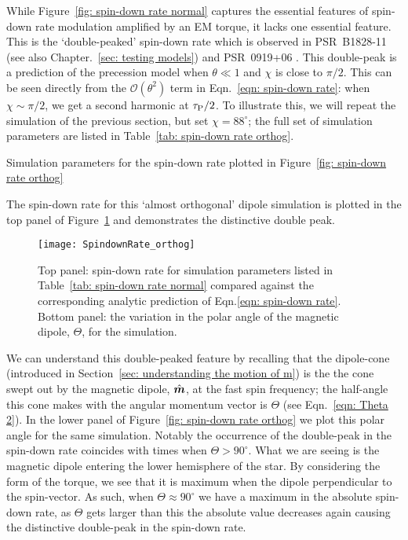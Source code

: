 \documentclass[../full_thesis/full_thesis.tex]{subfiles}
\newcommand{\thisdir}{../inertial_frame}
\begin{document}
While Figure~\ref{fig: spin-down rate normal} captures the essential features of
spin-down rate modulation amplified by an EM torque, it lacks one essential
feature. This is the `double-peaked' spin-down rate which is
observed in PSR~B1828-11 \citep{Lyne2010} (see also Chapter.~\ref{sec: testing
models}) and PSR~0919+06 \citep{Perera2015}.
This double-peak is a prediction of the precession model when $\theta \ll 1$
and $\chi$ is close to $\pi/2$. This can be seen directly from the
$\mathcal{O}(\theta^{2})$ term in Eqn.~\eqref{eqn: spin-down rate}: when $\chi
\sim \pi/2$, we get a second harmonic at $\tau_{\mathrm{P}}/2$. To illustrate this, we will
repeat the simulation of the previous section, but set $\chi=88^{\circ}$; the
full set of simulation parameters are listed in Table~\ref{tab: spin-down rate
orthog}.
\begin{table}[htb]
\centering

\caption{Simulation parameters for the spin-down rate plotted in Figure~\ref{fig:
spin-down rate orthog}}
\label{tab: spin-down rate orthog}
\end{table}
The spin-down rate for this `almost orthogonal' dipole simulation is plotted
in the top panel of Figure~\ref{fig: spin-down rate orthog} and demonstrates the
distinctive double peak.
\begin{figure}[htb]
\centering
\texttt{[image: SpindownRate\_orthog]}
\caption{Top panel: spin-down rate for simulation parameters listed in Table~\ref{tab:
spin-down rate normal} compared against the corresponding analytic prediction
of Eqn.\eqref{eqn: spin-down rate}. Bottom panel: the variation in the polar
angle of the magnetic dipole, $\Theta$, for the simulation.}
\label{fig: spin-down rate orthog}
\end{figure}

We can understand this double-peaked feature by recalling that the dipole-cone
(introduced in Section~\ref{sec: understanding the motion of m}) is the the cone
swept out by the magnetic dipole, $\hat{\boldsymbol{m}}$, at the fast spin frequency; the
half-angle this cone makes with the angular momentum vector is $\Theta$ (see
Eqn.~\eqref{eqn: Theta 2}).  In the lower panel of Figure~\ref{fig: spin-down
rate orthog} we plot this polar angle for the same simulation. Notably the
occurrence of the double-peak in the spin-down rate coincides with times when
$\Theta > 90^{\circ}$. What we are seeing is the magnetic dipole entering the
lower hemisphere of the star. By considering the form of the
\citet{Deutsch1955} torque, we see that it is maximum when the dipole
perpendicular to the spin-vector. As such, when $\Theta \approx 90^{\circ}$ we
have a maximum in the absolute spin-down rate, as $\Theta$ gets larger than
this the absolute value decreases again causing the distinctive double-peak in
the spin-down rate.
\end{document}
